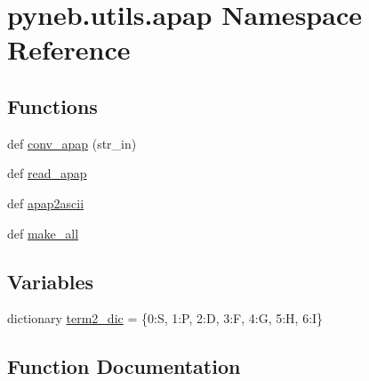 \hypertarget{namespacepyneb_1_1utils_1_1apap}{}\section{pyneb.\+utils.\+apap Namespace Reference}
\label{namespacepyneb_1_1utils_1_1apap}
\subsection*{Functions}
\begin{DoxyCompactItemize}
\item 
def \hyperlink{namespacepyneb_1_1utils_1_1apap_ad78f65e1ca140daa8a34fd88a91db97a}{conv\+\_\+apap} (str\+\_\+in)
\item 
def \hyperlink{namespacepyneb_1_1utils_1_1apap_ad24a246526c0913b752319c5a2846412}{read\+\_\+apap}
\item 
def \hyperlink{namespacepyneb_1_1utils_1_1apap_a4fccb2b8771d515b0be6f8a1921c0c58}{apap2ascii}
\item 
def \hyperlink{namespacepyneb_1_1utils_1_1apap_ac957f753a8fc1c667044b4324868753e}{make\+\_\+all}
\end{DoxyCompactItemize}
\subsection*{Variables}
\begin{DoxyCompactItemize}
\item 
dictionary \hyperlink{namespacepyneb_1_1utils_1_1apap_a3a64442bdcf9b3e98964d0f307c91659}{term2\+\_\+dic} = \{\textquotesingle{}0\textquotesingle{}\+:\textquotesingle{}S\textquotesingle{}, \textquotesingle{}1\textquotesingle{}\+:\textquotesingle{}P\textquotesingle{}, \textquotesingle{}2\textquotesingle{}\+:\textquotesingle{}D\textquotesingle{}, \textquotesingle{}3\textquotesingle{}\+:\textquotesingle{}F\textquotesingle{}, \textquotesingle{}4\textquotesingle{}\+:\textquotesingle{}G\textquotesingle{}, \textquotesingle{}5\textquotesingle{}\+:\textquotesingle{}H\textquotesingle{}, \textquotesingle{}6\textquotesingle{}\+:\textquotesingle{}I\textquotesingle{}\}
\end{DoxyCompactItemize}


\subsection{Function Documentation}
\hypertarget{namespacepyneb_1_1utils_1_1apap_a4fccb2b8771d515b0be6f8a1921c0c58}{}
